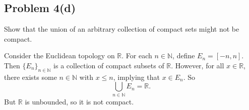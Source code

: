 \documentclass[12pt]{article}
\newenvironment{problem}
    {\begin{lrbox}{\mybox}\begin{minipage}{\textwidth-10pt}}
    {\end{minipage}\end{lrbox}\framebox[6.5in]{\usebox{\mybox}}}
\newcommand{\<}{\left\langle}
\renewcommand{\>}{\right\rangle}
\newcommand{\N}{\mathbb{N}}
\newcommand{\R}{\mathbb{R}}
\begin{document}
\subsection*{Problem 4(d)}
\begin{problem}
    Show that the union of an arbitrary collection of compact sets might not be compact.
\end{problem}
\medskip

Consider the Euclidean topology on $\R$. For each $n\in \N$, define $E_n = [-n,n]$. Then $\{E_n\}_{n\in\N}$ is a collection of compact subsets of $\R$. However, for all $x\in\R$, there exists some $n\in\N$ with $x\leq n$, implying that $x\in E_n$. So
\[\bigcup_{n\in\N} E_n = \R.\]
But $\R$ is unbounded, so it is not compact.
\end{document}

